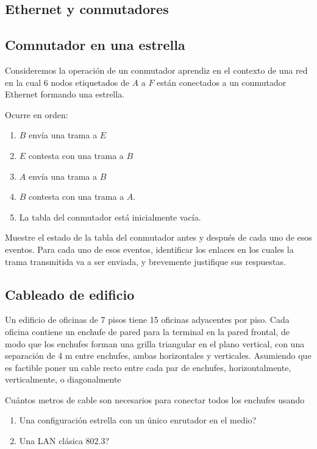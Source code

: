 \documentclass[12pt]{report}
\begin{document}
\begin{exer}
\section{Ethernet y conmutadores}
\subsection{Comnutador en una estrella \sthree}
Consideremos la operación de un conmutador aprendiz en el contexto de una red en la cual 6 nodos etiquetados de $A$ a $F$ están conectados a un conmutador Ethernet formando una estrella.

Ocurre en orden:
\begin{enumerate}
\item $B$ envía una trama a $E$
\item $E$ contesta con una trama a $B$
\item $A$ envía una trama a $B$
\item $B$ contesta con una trama a $A$.
\item La tabla del conmutador está inicialmente vacía.
\end{enumerate}

Muestre el estado de la tabla del conmutador antes y después de cada uno de esos eventos. Para cada uno de esos eventos, identificar los enlaces en los cuales la trama transmitida va a ser enviada, y brevemente justifique sus respuestas.
\end{exer}

\begin{exer}
\subsection{Cableado de edificio \stwo}
Un edificio de oficinas de 7 pisos tiene 15 oficinas adyacentes por piso. Cada oficina contiene un enchufe de pared para la terminal en la pared frontal, de modo que los enchufes forman una grilla triangular en el plano vertical, con una separación de 4 m entre enchufes, ambas horizontales y verticales. Asumiendo que es factible poner un cable recto entre cada par de enchufes, horizontalmente, verticalmente, o diagonalmente

Cuántos metros de cable son necesarios para conectar todos los enchufes usando

\begin{enumerate}
\item Una configuración estrella con un único enrutador en el medio?
\item Una LAN clásica 802.3?
\end{enumerate}
\end{exer}
\end{document}
